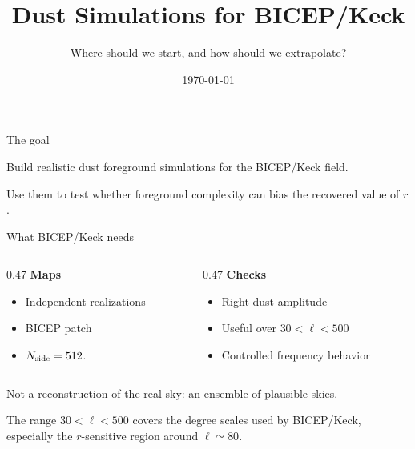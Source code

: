 \documentclass[aspectratio=169,11pt]{beamer}
\title[BICEP Dust Simulations]{Dust Simulations for BICEP/Keck}
\subtitle{Where should we start, and how should we extrapolate?}
\author{}
\date{\today}
\newcommand{\bk}{BICEP/Keck}
\begin{document}
\begin{frame}
  \titlepage
\end{frame}

\begin{frame}{The goal}
  \begin{center}
    \Large
    Build realistic dust foreground simulations for the \bk{} field.

    \vspace{0.8cm}
    Use them to test whether foreground complexity can bias the recovered value of $r$.
  \end{center}
\end{frame}

\begin{frame}{What BICEP/Keck needs}
  \begin{columns}[T,onlytextwidth]
    \begin{column}{0.47\textwidth}
      \textbf{Maps}
      \begin{itemize}
        \item Independent realizations
        \item BICEP patch
        \item $N_{\rm side}=512$.
      \end{itemize}
    \end{column}

    \begin{column}{0.47\textwidth}
      \textbf{Checks}
      \begin{itemize}
        \item Right dust amplitude
        \item Useful over $30<\ell<500$
        \item Controlled frequency behavior
      \end{itemize}
    \end{column}
  \end{columns}

  \vspace{0.55cm}
  \begin{center}
    \Large
    Not a reconstruction of the real sky: an ensemble of plausible skies.
  \end{center}

  \vspace{0.35cm}
  \begin{center}
    \normalsize
    The range $30<\ell<500$ covers the degree scales used by \bk{}, especially
    the $r$-sensitive region around $\ell\simeq80$.
  \end{center}
\end{frame}
\end{document}

